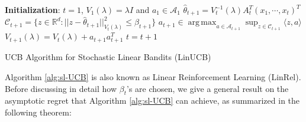 \documentclass[letterpaper,11pt,openright,openany]{book}
\numberwithin{equation}{section}
\theoremstyle{plain}
\theoremstyle{definition}
\def\R{{\mathbb R}}
\def\R{{\mathbb R}}
\def\t{{\theta}}
\DeclareMathOperator*{\argmax}{arg\,max}
\begin{document}
\begin{algorithm}[H]
\begin{algorithmic}[1]
\STATE  \textbf{Initialization}: $t=1$, $V_1(\lambda) = \lambda I$ and $a_1\in\mathcal A_1$
\STATE $\hat{\t}_{t+1} = V^{-1}_{t}(\lambda)A_{t}^T(x_1, \cdots, x_{t})^T$
\STATE $\mathcal C_{t+1} = \{z\in\R^d: ||z-\hat{\t}_{t+1}||^2_{V_{t}(\lambda)}\leq\beta_{t+1}\}$
\STATE $a_{t+1} \in \argmax_{a\in\mathcal A_{t+1}}\sup_{z\in\mathcal C_{t+1}}\langle z, a\rangle$
\STATE $V_{t+1}(\lambda) = V_{t}(\lambda)+a_{t+1}a_{t+1}^T$ 
\STATE $t = t +1$
\ENDWHILE
\end{algorithmic}
\caption{UCB Algorithm for Stochastic Linear Bandits (LinUCB)} 
\label{alg:sl-UCB}
\end{algorithm}

Algorithm \ref{alg:sl-UCB} is also known as Linear Reinforcement Learning (LinRel)\cite{dani2008stochastic, Rusmevichientong_2010}. Before discussing in detail how $\beta_t$'s are chosen, we give a general result on the asymptotic regret that Algorithm \ref{alg:sl-UCB} can achieve, as summarized in the following theorem:
\end{document}
